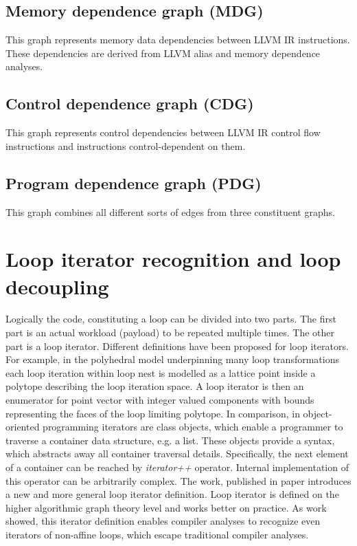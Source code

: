 \subsection{Memory dependence graph (MDG)} 
\label{background-mdg}
\qquad This graph represents memory data dependencies between LLVM IR instructions. These dependencies are derived from LLVM alias and memory dependence analyses.
 
\subsection{Control dependence graph (CDG)} 
\label{background-cdg}
\qquad This graph represents control dependencies between LLVM IR control flow instructions and instructions control-dependent on them.

\subsection{Program dependence graph (PDG)} 
\label{background-pdg}
\qquad This graph combines all different sorts of edges from three constituent graphs.

\section{Loop iterator recognition and loop decoupling \cite{iterator-recognition-paper}} \label{background-loop-decoupling}
\qquad Logically the code, constituting a loop can be divided into two parts. The first part is an actual workload (payload) to be repeated multiple times. The other part is a loop iterator.\newline
\null\qquad Different definitions have been proposed for loop iterators. For example, in the polyhedral model underpinning many loop transformations each loop iteration within loop nest is modelled as a lattice point inside a polytope describing the loop iteration space. A loop iterator is then an enumerator for point vector with integer valued components with bounds representing the faces of the loop limiting polytope.\newline
\null\qquad In comparison, in object-oriented programming iterators are class objects, which enable a programmer to traverse a container data structure, e.g. a list. These objects provide a syntax, which abstracts away all container traversal details. Specifically, the next element of a container can be reached by \textit{iterator++} operator. Internal implementation of this operator can be arbitrarily complex.\newline
\null\qquad The work, published in paper \cite{iterator-recognition-paper} introduces a new and more general loop iterator definition. Loop iterator is defined on the higher algorithmic graph theory level and works better on practice. As work \cite{iterator-recognition-paper} showed, this iterator definition enables compiler analyses to recognize even iterators of non-affine loops, which escape traditional compiler analyses.
